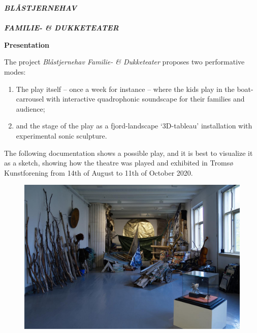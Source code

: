 
{}

{\LARGE \textsl{\textbf{BLÅSTJERNEHAV \\ \\ FAMILIE- \& DUKKETEATER}}}

\label{psh}

\vspace{\fill}

{\Large \textbf{Presentation}}

\bigskip
\bigskip

The project \textsl{Blåstjernehav Familie- \& Dukketeater} proposes two performative modes: 
\begin{enumerate}
\item The play itself -- once a week for instance -- where the kids play in the boat-carrousel with interactive quadrophonic soundscape for their families and audience;
\item and the stage of the play as a fjord-landscape `3D-tableau' installation with experimental sonic sculpture.
\end{enumerate}

\bigskip

The following documentation shows a possible play, and it is best to visualize it as a sketch, showing how the theatre was played and exhibited in Tromsø Kunstforening from 14th of August to 11th of October 2020. 

\bigskip

\begin{figure}[h]
		\includegraphics[width=\textwidth]{mp/img/img1}
		\label{sh}
\end{figure}

